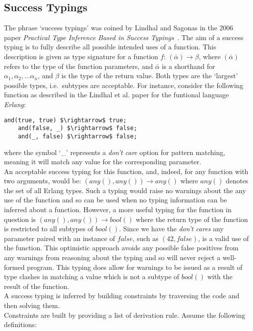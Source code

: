 \documentclass[12pt, titlepage]{article}
\begin{document}
\subsection{Success Typings}
The phrase `success typings' was coined by Lindhal and Sagonas in the 2006 paper \textit{Practical Type Inference Based in Success Typings}~\cite{lindhal06}. The aim of a success typing is to fully describe all possible intended uses of a function. This description is given as type signature for a function $f$: $(\bar{\alpha}) \rightarrow \beta$, where $(\bar{\alpha})$ refers to the type of the function parameters, and $\bar{\alpha}$ is a shorthand for $\alpha_1, \alpha_2,...\alpha_n$, and $\beta$ is the type of the return value. Both types are the `largest' possible types, i.e.\ subtypes are acceptable. For instance, consider the following function as described in the Lindhal et al. paper for the funtional language \textit{Erlang}:
\begin{lstlisting}[mathescape]
	and(true, true) $\rightarrow$ true;
	and(false, _) $\rightarrow$ false;
	and(_, false) $\rightarrow$ false;
\end{lstlisting}
where the symbol `\_' represents a \textit{don't care} option for pattern matching, meaning it will match any value for the corresponding parameter. \\
An acceptable success typing for this function, and, indeed, for any function with two arguments, would be: $(any(), any()) \rightarrow any()$ where $any()$ denotes the set of all Erlang types. Such a typing would raise no warnings about the any use of the function and so can be used when no typing information can be inferred about a function. However, a more useful typing for the function in question is $(any(), any()) \rightarrow bool()$ where the return type of the function is restricted to all subtypes of $bool()$. Since we have the \textit{don't cares} any parameter paired with an instance of $false$, such as $(42, false)$, is a valid use of the function. This optimistic approach avoids any possible false positives from any warnings from reasoning about the typing and so will never reject a well-formed program. This typing does allow for warnings to be issued as a result of type clashes in matching a value which is not a subtype of $bool()$ with the result of the function. \\
A success typing is inferred by building constraints by traversing the code and then solving them. \\
Constraints are built by providing a list of derivation rule. Assume the following definitions:
\end{document}
